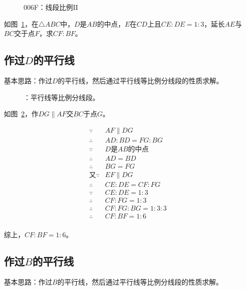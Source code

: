 

\begin{figure}[htbp]
  \centering
  \caption{006F：线段比例II} \label{fig:006F}
\end{figure}

如图~\ref{fig:006F}，在$\triangle ABC$中，$D$是$AB$的中点，$E$在$CD$上且$CE:DE = 1:3$，延长$AE$与$BC$交于点$F$，求$CF:BF$。


\subsection{作过$D$的平行线} \label{subsec:006F-parD}

基本思路：作过$D$的平行线，然后通过平行线等比例分线段的性质求解。

\begin{figure}[htbp]
  \centering
  \caption{：平行线等比例分线段。}
  \label{fig:006F-parD}
\end{figure}

如图~\ref{fig:006F-parD}，作$DG \parallel AF$交$BC$于点$G$。

\begin{align*}
  \because  {}& AF \parallel DG \\
  \therefore{}& AD:BD = FG:BG \\
  \because  {}& D\text{是}AB\text{的中点} \\
  \therefore{}& AD = BD \\
  \therefore{}& BG = FG \\
  \text{又}\because{}& EF \parallel DG \\
  \therefore{}& CE:DE = CF:FG \\
  \because  {}& CE:DE = 1:3 \\
  \therefore{}& CF:FG = 1:3 \\
  \therefore{}& CF:FG:BG = 1:3:3 \\
  \therefore{}& CF:BF = 1:6 \\
\end{align*}

综上，$CF:BF = 1:6$。

\subsection{作过$B$的平行线} \label{subsec:006F-parB}

基本思路：作过$B$的平行线，然后通过平行线等比例分线段的性质求解。

